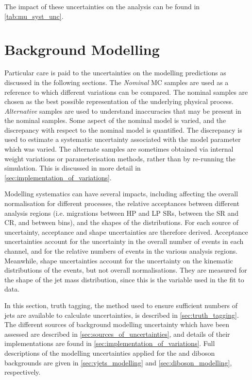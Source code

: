 The impact of these uncertainties on the analysis can be found in \cref{tab:mu_syst_unc}.



\section{Background Modelling}\label{sec:vhbb_modelling}

Particular care is paid to the uncertainties on the modelling predictions as discussed in the following sections.
The \textit{Nominal} MC samples are used as a reference to which different variations can be compared.
The nominal samples are chosen as the best possible representation of the underlying physical process.
\textit{Alternative} samples are used to understand inaccuracies that may be present in the nominal samples.
Some aspect of the nominal model is varied, and the discrepancy with respect to the nominal model is quantified.
The discrepancy is used to estimate a systematic uncertainty associated with the model parameter which was varied.
The alternate samples are sometimes obtained via internal weight variations or parameterisation methods, rather than by re-running the simulation.
This is discussed in more detail in \cref{sec:implementation_of_variations}.

Modelling systematics can have several impacts, including affecting the overall normalisation for different processes, the relative acceptances between different analysis regions (i.e. migrations between HP and LP SRs, between the SR and CR, and between \pTV bins), and the shapes of the \mJ distributions.
For each source of uncertainty, acceptance and shape uncertainties are therefore derived.
Acceptance uncertainties account for the uncertainty in the overall number of events in each channel, and for the relative numbers of events in the various analysis regions.
Meanwhile, shape uncertainties account for the uncertainty on the kinematic distributions of the events, but not overall normalisations.
They are measured for the shape of the \largeR jet mass distribution, since this is the variable used in the fit to data.

In this section, truth tagging, the method used to ensure sufficient numbers of jets are available to calculate uncertainties, is described in \cref{sec:truth_tagging}.
The different sources of background modelling uncertainty which have been assessed are described in \cref{sec:sources_of_uncertainties}, and details of their implementations are found in \cref{sec:implementation_of_variations}.
Full descriptions of the modelling uncertainties applied for the \Vjets and diboson backgrounds are given in \cref{sec:vjets_modelling} and \cref{sec:diboson_modelling}, respectively.


